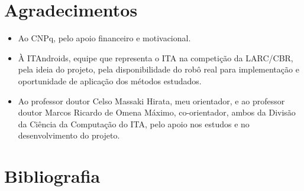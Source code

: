 \documentclass[a4paper,12pt]{article}
\begin{document}
\section{Agradecimentos}

\begin{itemize}
\item Ao CNPq, pelo apoio financeiro e motivacional.
\item À ITAndroids, equipe que representa o ITA na competição da LARC/CBR, pela ideia do projeto, pela disponibilidade do robô real para implementação e oportunidade de aplicação dos métodos estudados.
\item Ao professor doutor Celso Massaki Hirata, meu orientador, e ao professor doutor Marcos Ricardo de Omena Máximo, co-orientador, ambos da Divisão da Ciência da Computação do ITA, pelo apoio nos estudos e no desenvolvimento do projeto.

\end{itemize}

\section{Bibliografia}

\printbibliography
\end{document}
